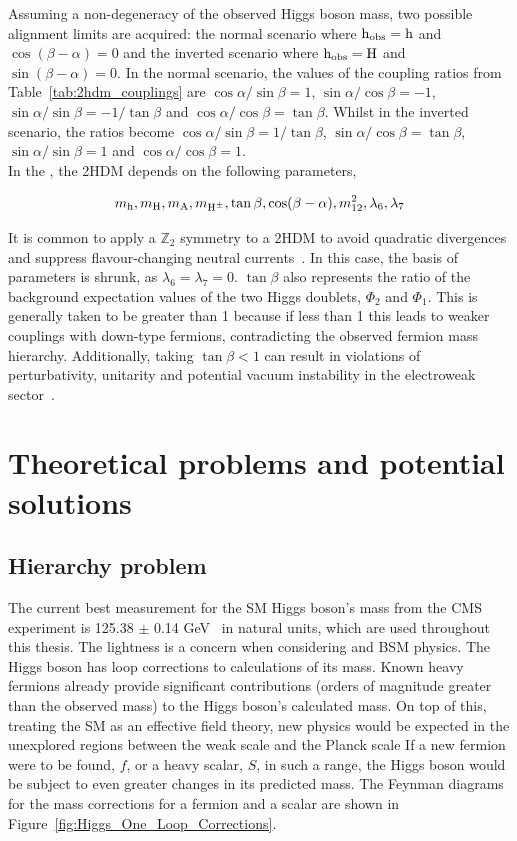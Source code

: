 Assuming a non-degeneracy of the observed Higgs boson mass, two possible alignment limits are acquired: the normal scenario where ${\text{h}}_{\text{obs}}={\text{h}}$ and $\cos(\beta-\alpha)=0$ and the inverted scenario where ${\text{h}}_{\text{obs}}={\text{H}}$ and $\sin(\beta-\alpha)=0$.
In the normal scenario, the values of the coupling ratios from Table~\ref{tab:2hdm_couplings} are $\cos\alpha/\sin\beta=1$, $\sin\alpha/\cos\beta=-1$, $\sin\alpha/\sin\beta=-1/\tan\beta$ and $\cos\alpha/\cos\beta=\tan\beta$. 
Whilst in the inverted scenario, the ratios become $\cos\alpha/\sin\beta=1/\tan\beta$, $\sin\alpha/\cos\beta=\tan\beta$, $\sin\alpha/\sin\beta=1$ and $\cos\alpha/\cos\beta=1$. \\

In the , the \ac{2HDM} depends on the following parameters,

\begin{equation}
m_{{\text{h}}}, m_{{\text{H}}}, m_{{\text{A}}}, m_{{\text{H}^{\pm}}}, \tan\beta, \cos(\beta-\alpha), m_{12}^{2}, \lambda_{6}, \lambda_{7}
\end{equation}

It is common to apply a $\mathbb{Z}_2$ symmetry to a \ac{2HDM} to avoid quadratic divergences and suppress flavour-changing neutral currents~\cite{PhysRevD.15.1958,Ginzburg:2004vp}.
In this case, the basis of parameters is shrunk, as $\lambda_6 = \lambda_7 = 0$.
$\tan\beta$ also represents the ratio of the background expectation values of the two Higgs doublets, $\Phi_2$ and $\Phi_1$.
This is generally taken to be greater than 1 because if less than 1 this leads to weaker couplings with down-type fermions, contradicting the observed fermion mass hierarchy. 
Additionally, taking $\tan\beta < 1$ can result in violations of perturbativity, unitarity and potential vacuum instability in the electroweak sector~\cite{SUSY_Primer}.


\section{Theoretical problems and potential solutions}

\subsection{Hierarchy problem}

The current best measurement for the \ac{SM} Higgs boson’s mass from the \ac{CMS} experiment is 125.38 $\pm$ 0.14 GeV~\cite{CMS:2020xrn} in natural units, which are used throughout this thesis.
The lightness is a concern when considering  and \ac{BSM} physics. 
The Higgs boson has loop corrections to calculations of its mass. 
Known heavy fermions already provide significant contributions (orders of magnitude greater than the observed mass) to the Higgs boson’s calculated mass. 
On top of this, treating the \ac{SM} as an effective field theory, new physics would be expected in the unexplored regions between the weak scale and the Planck scale
If a new fermion were to be found, $f$, or a heavy scalar, $S$, in such a range, the Higgs boson would be subject to even greater changes in its predicted mass. 
The Feynman diagrams for the mass corrections for a fermion and a scalar are shown in Figure~\ref{fig:Higgs_One_Loop_Corrections}.

